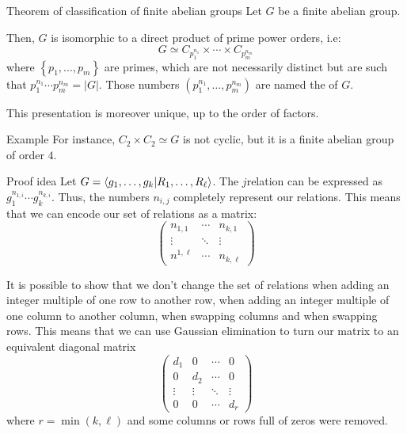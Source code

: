 \documentclass[a4paper]{article}
\begin{document}
\begin{parag}{Theorem of classification of finite abelian groups}
    Let $G$ be a finite abelian group. 

    Then, $G$ is isomorphic to a direct product of prime power orders, i.e: 
    \[G \simeq C_{p_1^{n_1}} \times \cdots \times C_{p_m^{n_m}}\]
    where $\left\{p_1, \ldots, p_m\right\}$ are primes, which are not necessarily distinct but are such that $p_1^{n_1} \cdots p_m^{n_m} = \left|G\right|$. Those numbers $\left(p_1^{n_1}, \ldots, p_m^{n_m}\right)$ are named the  of $G$.

    This presentation is moreover unique, up to the order of factors.

    \begin{subparag}{Example}
        For instance, $C_2 \times C_2 \simeq G$ is not cyclic, but it is a finite abelian group of order $4$.
    \end{subparag}

    \begin{subparag}{Proof idea}
        Let $G = \braket{g_1, \ldots, g_k}{R_1, \ldots, R_{\ell }}$. The $j$\Th relation can be expressed as $g_1^{n_{1, i}} \cdots g_k^{n_{k, i}}$. Thus, the numbers $n_{i, j}$ completely represent our relations. This means that we can encode our set of relations as a matrix: 
        \[\begin{pmatrix} n_{1, 1} & \cdots & n_{k, 1} \\ \vdots & \ddots & \vdots \\ n^{1, \ell } & \cdots & n_{k, \ell } \end{pmatrix} \]
        
        It is possible to show that we don't change the set of relations when adding an integer multiple of one row to another row, when adding an integer multiple of one column to another column, when swapping columns and when swapping rows. This means that we can use Gaussian elimination to turn our matrix to an equivalent diagonal matrix
        \[\begin{pmatrix} d_{1} & 0 & \cdots & 0 \\ 0 & d_{2} & \cdots & 0 \\ \vdots & \vdots & \ddots & \vdots \\ 0 & 0 & \cdots & d_{r} \end{pmatrix} \]
        where $r = \min\left(k, \ell \right)$ and some columns or rows full of zeros were removed.


\end{subparag}
\end{parag}
\end{document}
